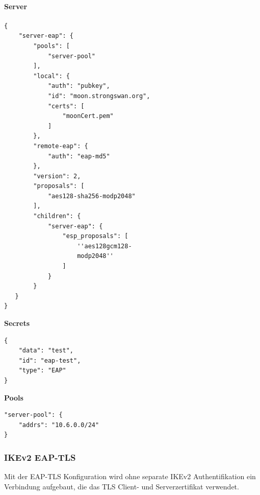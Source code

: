\begin{minipage}[t]{0.5\textwidth}
\vspace{0pt}
\paragraph{Server}\mbox{}\medskip
\begin{lstlisting}[style=BashInputStyle]
{
    "server-eap": {
        "pools": [
            "server-pool"
        ],
        "local": {
            "auth": "pubkey",
            "id": "moon.strongswan.org",
            "certs": [
                "moonCert.pem"
            ]
        },
        "remote-eap": {
            "auth": "eap-md5"
        },
        "version": 2,
        "proposals": [
            "aes128-sha256-modp2048"
        ],
        "children": {
            "server-eap": {
                "esp_proposals": [
                    ''aes128gcm128-
                    modp2048''
                ]
            }
        }
   }
}
\end{lstlisting}
\hspace*{18pt}\textbf{Secrets}\mbox{}\medskip
\begin{lstlisting}[style=BashInputStyle]
{
    "data": "test",
    "id": "eap-test",
    "type": "EAP"
}
\end{lstlisting}
\hspace*{18pt}\textbf{Pools}\mbox{}\medskip
\begin{lstlisting}[style=BashInputStyle]
"server-pool": {
    "addrs": "10.6.0.0/24"
}
\end{lstlisting}
\end{minipage}


\subsubsection{IKEv2 EAP-TLS}
Mit der EAP-TLS Konfiguration wird ohne separate IKEv2 Authentifikation ein Verbindung aufgebaut, die das TLS Client- und Serverzertifikat verwendet.\\



